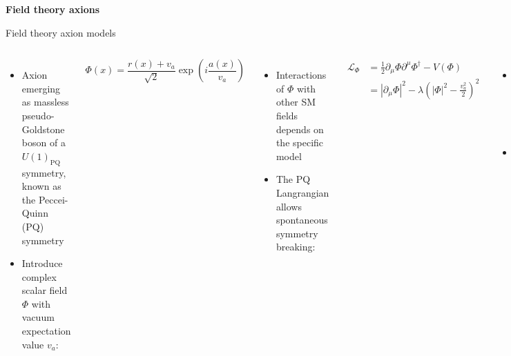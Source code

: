 \documentclass[aspectratio=1610, 9pt]{beamer}
\begin{document}
\begin{frame}[noframenumbering]
  \centering
  \Huge \textbf{\textcolor{tugreen}{Field theory axions}}
\end{frame}

\begin{frame}{Field theory axion models}
  \begin{columns}
    \column{\textwidth}
    \begin{itemize}
      \item Axion emerging as massless pseudo-Goldstone boson of a $U(1)_{\mathrm{PQ}}$ symmetry, known as the Peccei-Quinn (PQ) symmetry
      \item Introduce complex scalar field $\Phi$ with vacuum expectation value $v_a$:
    \end{itemize}
    \begin{equation*}
      \Phi(x) = \frac{r(x)+v_a}{\sqrt{2}}\exp \left(i\frac{a(x)}{v_a}\right) 
    \end{equation*}
    \begin{itemize}
      \item Interactions of $\Phi$ with other SM fields depends on the specific model
      \item The PQ Langrangian allows spontaneous symmetry breaking:
    \end{itemize}
    \begin{align*}
      \mathcal{L}_{\Phi} &= \frac{1}{2} \partial_\mu \Phi \partial^\mu \Phi^\dagger - V(\Phi) \\
      & =  {| \partial_\mu \Phi |}^2 - \lambda \left( |\Phi|^2 - \frac{v_a^2}{2} \right)^2
    \end{align*}
    \begin{itemize}
      \item PQ symmetry is spontaneously broken below high scale $f_a$
      \item Axion aqquires mass due to QCD potential
    \end{itemize}
  \end{columns} 
\end{frame}
\end{document}

